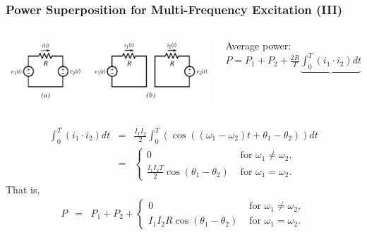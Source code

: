 \documentclass{beamer}
\begin{document}
\begin{frame}[fragile]
\frametitle{Power Superposition for Multi-Frequency Excitation (III)}

\begin{columns}[c]

\includegraphics[width=\textwidth]{src/super1.png}

Average power: 
$P = P_1 + P_2 + \frac{2 R}{T} \underbrace{\int_{0}^T (i_1 \cdot i_2) dt}$

\end{columns}

\begin{eqnarray}
\int_{0}^T (i_1 \cdot i_2) dt
&=& \frac{I_1 I_2}{2} \int_{0}^T \left(
\cos( (\omega_1 - \omega_2) t + \theta_1 - \theta_2) 
\right) dt
\nonumber \\
&=& \left\{
\begin{array}{ll}
0 & \mbox{ for } \omega_1 \neq \omega_2,
\\
\frac{I_1 I_2 T}{2} \cos(\theta_1 - \theta_2)
& \mbox{ for } \omega_1 = \omega_2.
\end{array}
\right.
\nonumber 
\end{eqnarray}
That is,
\begin{eqnarray}
P &=& P_1 + P_2 + \left\{
\begin{array}{ll}
0 & \mbox{ for } \omega_1 \neq \omega_2,
\\
I_1 I_2 R \cos(\theta_1 - \theta_2)
& \mbox{ for } \omega_1 = \omega_2.
\end{array}
\right.
\label{eq: power superposition}
\end{eqnarray}

\end{frame}

\end{document}
